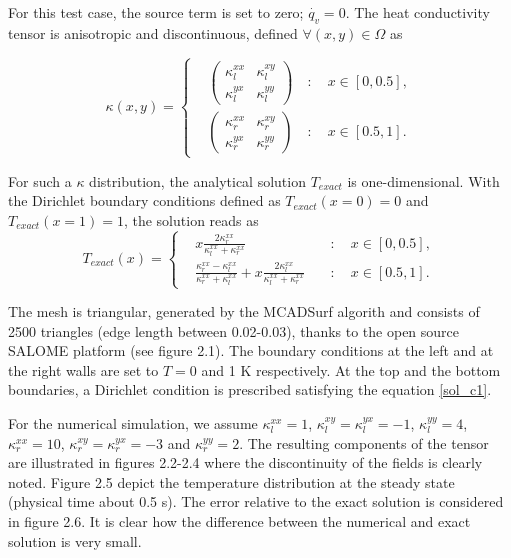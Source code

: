 For this test case, the source term is set to zero; $\dot{q_v}=0$. The heat conductivity tensor is anisotropic and discontinuous, defined $\forall (x,y)\in \Omega$ as 

\begin{equation}\label{tensor_c1}
\kappa(x,y)=
\left\{
\begin{aligned}
&\displaystyle\left(\begin{matrix} \kappa_l^{xx} & \kappa_l^{xy} \\ \kappa_l^{yx} & \kappa_l^{yy} \end{matrix}\right) \quad : \quad x\in[0,0.5], \\
&\displaystyle\left(\begin{matrix} \kappa_r^{xx} & \kappa_r^{xy} \\ \kappa_r^{yx} & \kappa_r^{yy} \end{matrix}    \right) \quad : \quad x\in[0.5,1].
\end{aligned}
\right.
\end{equation}

For such a $\kappa$ distribution, the analytical solution $T_{exact}$ is one-dimensional. With the Dirichlet boundary conditions defined as $T_{exact}(x=0)=0$ and $T_{exact}(x=1)=1$, the solution reads as
\begin{equation}\label{sol_c1}
T_{exact}(x)=\left\{
\begin{aligned}
&\displaystyle x\frac{2\kappa_r^{xx}}{\kappa_l^{xx}+\kappa_r^{xx}} \quad &: \quad x\in[0,0.5], \\
&\displaystyle\frac{\kappa_r^{xx}-\kappa_l^{xx}}{\kappa_r^{xx}+\kappa_l^{xx}} + x\frac{2\kappa_l^{xx}}{\kappa_l^{xx}+\kappa_r^{xx}}\quad &: \quad x\in[0.5,1].
\end{aligned}
\right.
\end{equation}

The mesh is triangular, generated by the MCADSurf algorith and consists of 2500 triangles (edge length between 0.02-0.03), thanks to the open source SALOME platform (see figure 2.1).  The boundary conditions at the left and at the right walls are set to $T=0$ and 1 K respectively. At the top and the bottom boundaries, a Dirichlet condition is prescribed satisfying the equation \eqref{sol_c1}.

For the numerical simulation, we assume $\kappa_l^{xx}=1$, $\kappa_l^{xy}= \kappa_l^{yx}=-1$, $\kappa_l^{yy}=4$, $\kappa_r^{xx}=10$, $\kappa_r^{xy}= \kappa_r^{yx}=-3$ and  $\kappa_r^{yy}=2$. The resulting components of the tensor are illustrated in figures 2.2-2.4 where the discontinuity of the fields is clearly noted. Figure 2.5 depict the temperature distribution at the steady state (physical time about 0.5 s). The error relative to the exact solution is considered in figure 2.6.  It is clear how the difference between the numerical and exact solution is very small. 


